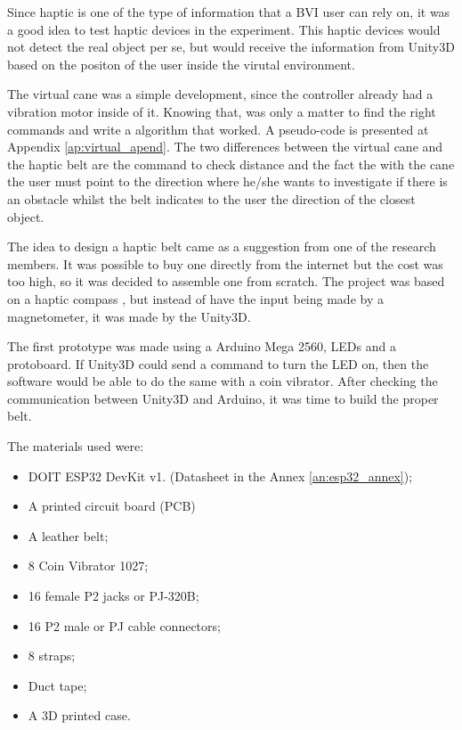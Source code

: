  Since haptic is one of the type of information that a BVI user can rely on, it was a good idea to test haptic devices in the experiment. This haptic devices would not detect the real object per se, but would receive the information from Unity3D based on the positon of the user inside the virutal environment.
 
 The virtual cane was a simple development, since the controller already had a vibration motor inside of it. Knowing that, was only a matter to find the right commands and write a algorithm that worked. A pseudo-code is presented at Appendix \ref{ap:virtual_apend}. The two differences between the virtual cane and the haptic belt are the command to check distance and the fact the with the cane the user must point to the direction where he/she wants to investigate if there is an obstacle whilst the belt indicates to the user the direction of the closest object.
 
 The idea to design a haptic belt came as a suggestion from one of the research members. It was possible to buy one directly from the internet but the cost was too high, so it was decided to assemble one from scratch. The project was based on a haptic compass \cite{kylecorry31_instructables_2020}, but instead of have the input being made by a magnetometer, it was made by the Unity3D.
 
 The first prototype was made using a Arduino Mega 2560, LEDs and a protoboard. If Unity3D could send a command to turn the LED on, then the software would be able to do the same with a coin vibrator. After checking the communication between Unity3D and Arduino, it was time to build the proper belt.
 
 The materials used were:
 \begin{itemize}
     \item DOIT ESP32 DevKit v1. (Datasheet in the Annex \ref{an:esp32_annex});
     \item A printed circuit board (PCB)
     \item A leather belt;
     \item 8 Coin Vibrator 1027;
     \item 16 female P2 jacks or PJ-320B;
     \item 16 P2 male or PJ cable connectors;
     \item 8 straps;
     \item Duct tape;
     \item A 3D printed case.
 \end{itemize}
 
